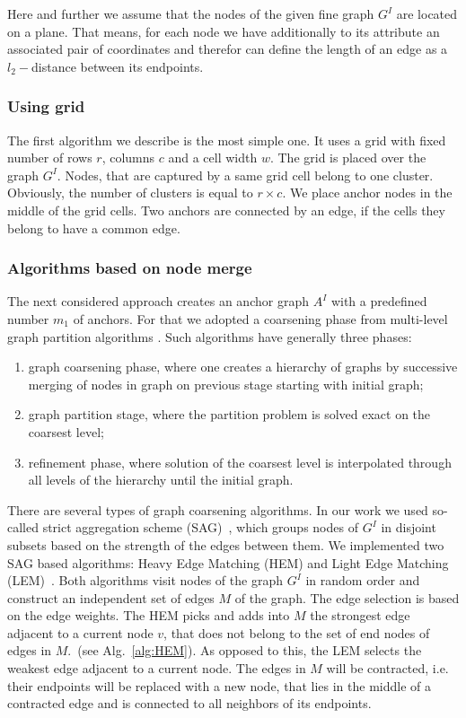 Here and further we assume that the nodes of the given fine graph $G^I$ are located on a plane. That means, for each node we have additionally to its attribute an associated pair of coordinates and therefor can define the length of an edge as a $l_2-$distance between its endpoints.
\subsubsection{Using grid}	
The first algorithm we describe is the most simple one. It uses a grid with fixed number of rows $r$, columns $c$ and a cell width $w$. The grid is placed over the graph $G^I$. Nodes, that are captured by a same grid cell belong to one cluster. Obviously, the number of clusters is equal to $r\times c$. We place anchor nodes in the middle of the grid cells. Two anchors are connected by an edge, if the cells they belong to have a common edge.
\subsubsection{Algorithms based on node merge}
The next considered approach creates an anchor graph $A^I$ with a predefined number $m_1$ of anchors. For that we adopted a coarsening phase from multi-level graph partition algorithms \cite{Chevalier09_GP, Safro2012_GC, Karypis95_GP, Hendrickson1995}.
Such algorithms have generally three phases: 
\begin{enumerate}
	\item graph coarsening phase, where one creates a hierarchy of graphs by successive merging of nodes in graph on previous stage starting with initial graph;
	\item graph partition stage, where the partition problem is solved exact on the coarsest level;
	\item refinement phase, where solution of the coarsest level is interpolated through all levels of the hierarchy until the initial graph.
\end{enumerate}
There are several types of graph coarsening algorithms. In our work we used so-called strict aggregation scheme (SAG)~\cite{Chevalier09_GP}, which groups nodes of $G^I$ in disjoint subsets based on the strength of the edges between them. We implemented two SAG based algorithms: Heavy Edge Matching (HEM) and Light Edge Matching (LEM)~\cite{Chevalier09_GP}. Both algorithms visit nodes of the graph $G^I$ in random order and construct an independent set of edges $M$ of the graph. The edge selection is based on the edge weights. The HEM picks and adds into $M$ the strongest edge adjacent to a current node $v$, that does not belong to the set of end nodes of edges in $M$.~(see Alg.~\ref{alg:HEM}). As opposed to this, the LEM selects the weakest edge adjacent to a current node. The edges in $M$ will be contracted, i.e. their endpoints will be replaced with a new node, that lies in the middle of a contracted edge and is connected to all neighbors of its endpoints.

